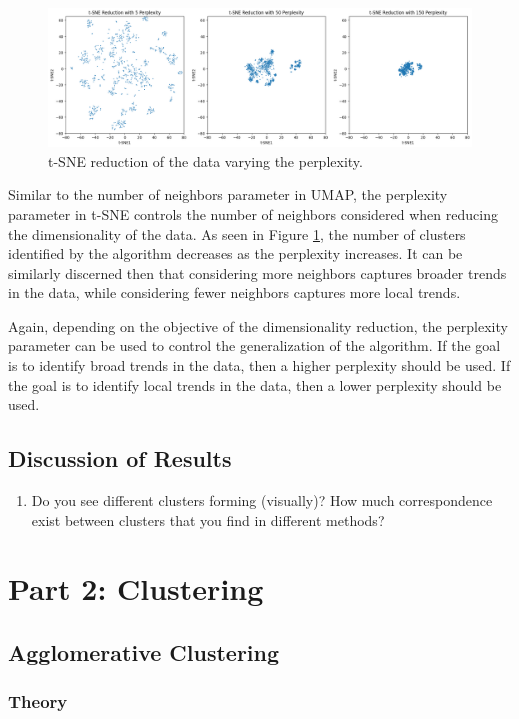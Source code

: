 \documentclass[12pt]{article}
\begin{document}
\begin{figure}[H]
    \centering
    \includegraphics[width=\textwidth]{Images/t-sne_vary.png}
    \caption{t-SNE reduction of the data varying the perplexity.}
    \label{fig:TSNE_vary}
\end{figure}

Similar to the number of neighbors parameter in UMAP, the perplexity parameter in t-SNE controls the number of neighbors considered when reducing the dimensionality of the data. As seen in Figure \ref{fig:TSNE_vary}, the number of clusters identified by the algorithm decreases as the perplexity increases. It can be similarly discerned then that considering more neighbors captures broader trends in the data, while considering fewer neighbors captures more local trends.

Again, depending on the objective of the dimensionality reduction, the perplexity parameter can be used to control the generalization of the algorithm. If the goal is to identify broad trends in the data, then a higher perplexity should be used. If the goal is to identify local trends in the data, then a lower perplexity should be used.

\subsection{Discussion of Results}
\begin{enumerate}
    \item Do you see different clusters forming (visually)? How much correspondence exist
    between clusters that you find in different methods?
\end{enumerate}

\section{Part 2: Clustering}
\subsection{Agglomerative Clustering}
\subsubsection{Theory}
\end{document}
